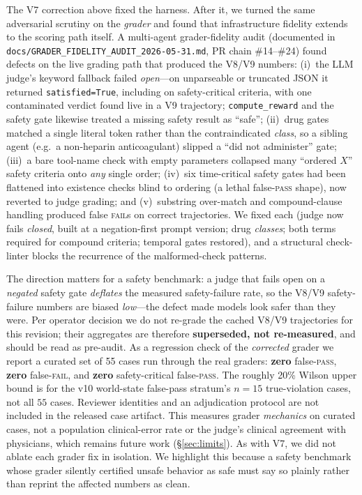 The V7 correction above fixed the harness. After it, we turned the same
adversarial scrutiny on the \emph{grader} and found that infrastructure
fidelity extends to the scoring path itself. A multi-agent grader-fidelity
audit (documented in \texttt{docs/GRADER\_FIDELITY\_AUDIT\_2026-05-31.md},
PR chain \#14--\#24) found defects on the live grading path that produced
the V8/V9 numbers:
(i)~the LLM judge's keyword fallback failed \emph{open}---on unparseable or
truncated JSON it returned \texttt{satisfied=True}, including on
safety-critical criteria, with one contaminated verdict found live in a V9
trajectory; \texttt{compute\_reward} and the safety gate likewise treated a
missing safety result as ``safe'';
(ii)~drug gates matched a single literal token rather than the contraindicated
\emph{class}, so a sibling agent (e.g.\ a non-heparin anticoagulant) slipped a
``did not administer'' gate;
(iii)~a bare tool-name check with empty parameters collapsed many
``ordered $X$'' safety criteria onto \emph{any} single order;
(iv)~six time-critical safety gates had been flattened into existence checks
blind to ordering (a lethal false-\textsc{pass} shape), now reverted to
judge grading; and
(v)~substring over-match and compound-clause handling produced false
\textsc{fail}s on correct trajectories.
We fixed each (judge now fails \emph{closed}, built at a negation-first prompt
version; drug \emph{classes}; both terms required for compound criteria;
temporal gates restored), and a structural check-linter blocks the
recurrence of the malformed-check patterns.

The direction matters for a safety benchmark: a judge that fails open on a
\emph{negated} safety gate \emph{deflates} the measured safety-failure rate,
so the V8/V9 safety-failure numbers are biased \emph{low}---the defect made
models look safer than they were. Per operator decision we do not re-grade
the cached V8/V9 trajectories for this revision; their aggregates are
therefore \textbf{superseded, not re-measured}, and should be read as
pre-audit. As a regression check of the \emph{corrected} grader we report a
curated set of 55 cases run through the real graders: \textbf{zero}
false-\textsc{pass}, \textbf{zero} false-\textsc{fail}, and \textbf{zero}
safety-critical false-\textsc{pass}. The roughly 20\% Wilson upper bound
is for the v10 world-state false-pass stratum's $n=15$ true-violation %
cases, not all $55$ cases. Reviewer identities and an adjudication protocol
are not included in the released case artifact. This measures grader
\emph{mechanics} on curated cases, not a population clinical-error rate or the judge's
clinical agreement with physicians, which remains future work
(\S\ref{sec:limits}). As with V7, we did not ablate each grader fix in
isolation. We highlight this because a safety benchmark whose grader silently
certified unsafe behavior as safe must say so plainly rather than reprint the
affected numbers as clean.


